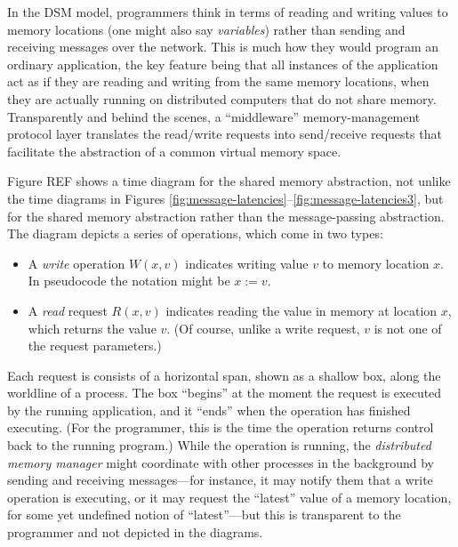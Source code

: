 \documentclass[]             %
{NASA}                       %
\theoremstyle{definition}
\begin{document}
In the DSM model, programmers think in terms of reading and writing
values to memory locations (one might also say \emph{variables})
rather than sending and receiving messages over the network. This is
much how they would program an ordinary application, the key feature
being that all instances of the application act as if they are reading
and writing from the same memory locations, when they are actually
running on distributed computers that do not share
memory. Transparently and behind the scenes, a ``middleware''
memory-management protocol layer translates the read/write requests
into send/receive requests that facilitate the abstraction of a common
virtual memory space.




Figure REF shows a time diagram for the shared memory abstraction, not
unlike the time diagrams in Figures
\ref{fig:message-latencies}--\ref{fig:message-latencies3}, but for the
shared memory abstraction rather than the message-passing
abstraction. The diagram depicts a series of operations, which come in
two types:
\begin{itemize}
  \item A \emph{write} operation $W(x, v)$ indicates writing value $v$
    to memory location $x$. In pseudocode the notation might be $x :=
    v$.
  \item A \emph{read} request $R(x, v)$ indicates reading the value in
    memory at location $x$, which returns the value $v$. (Of course,
    unlike a write request, $v$ is not one of the request parameters.)
\end{itemize}
Each request is consists of a horizontal span, shown as a shallow box,
along the worldline of a process. The box ``begins'' at the moment the
request is executed by the running application, and it ``ends'' when
the operation has finished executing. (For the programmer, this is the
time the operation returns control back to the running program.) While
the operation is running, the \emph{distributed memory manager} might
coordinate with other processes in the background by sending and
receiving messages---for instance, it may notify them that a write
operation is executing, or it may request the ``latest'' value of a
memory location, for some yet undefined notion of ``latest''---but
this is transparent to the programmer and not depicted in the
diagrams.
\end{document}
